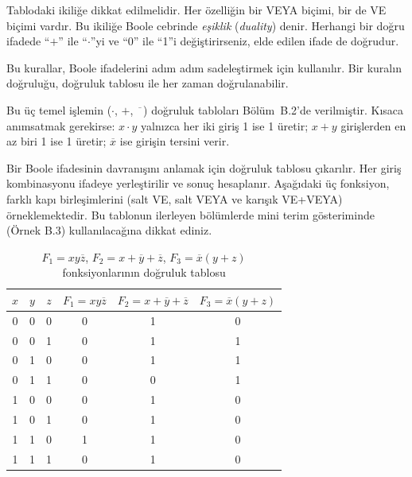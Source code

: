 Tablodaki ikiliğe dikkat edilmelidir. Her özelliğin bir VEYA biçimi, bir de VE biçimi vardır. Bu ikiliğe Boole cebrinde \emph{eşiklik} (\emph{duality}) denir. Herhangi bir doğru ifadede ``$+$'' ile ``$\cdot$''yi ve ``0'' ile ``1''i değiştirirseniz, elde edilen ifade de doğrudur.

Bu kurallar, Boole ifadelerini adım adım sadeleştirmek için kullanılır. Bir kuralın doğruluğu, doğruluk tablosu ile her zaman doğrulanabilir.

Bu üç temel işlemin ($\cdot$, $+$, $\overline{\phantom{x}}$) doğruluk tabloları Bölüm~B.2'de verilmiştir. Kısaca anımsatmak gerekirse: $x \cdot y$ yalnızca her iki giriş 1 ise 1 üretir; $x + y$ girişlerden en az biri 1 ise 1 üretir; $\overline{x}$ ise girişin tersini verir.

Bir Boole ifadesinin davranışını anlamak için doğruluk tablosu çıkarılır. Her giriş kombinasyonu ifadeye yerleştirilir ve sonuç hesaplanır. Aşağıdaki üç fonksiyon, farklı kapı birleşimlerini (salt VE, salt VEYA ve karışık VE+VEYA) örneklemektedir. Bu tablonun ilerleyen bölümlerde mini terim gösteriminde (Örnek B.3) kullanılacağına dikkat ediniz.

\begin{table}[H]
\centering
\caption[Üç örnek fonksiyonun doğruluk tablosu]{$F_1 = x y \overline{z}$, $F_2 = x + \overline{y} + \overline{z}$, $F_3 = \overline{x}(y + z)$ fonksiyonlarının doğruluk tablosu}
\label{tab:B.3}
\begin{tabular}{ccc|ccc}
\toprule
$x$ & $y$ & $z$ & $F_1 = x y \overline{z}$ & $F_2 = x + \overline{y} + \overline{z}$ & $F_3 = \overline{x}(y + z)$ \\
\midrule
0 & 0 & 0 & 0 & 1 & 0 \\
0 & 0 & 1 & 0 & 1 & 1 \\
0 & 1 & 0 & 0 & 1 & 1 \\
0 & 1 & 1 & 0 & 0 & 1 \\
1 & 0 & 0 & 0 & 1 & 0 \\
1 & 0 & 1 & 0 & 1 & 0 \\
1 & 1 & 0 & 1 & 1 & 0 \\
1 & 1 & 1 & 0 & 1 & 0 \\
\bottomrule
\end{tabular}
\end{table}

